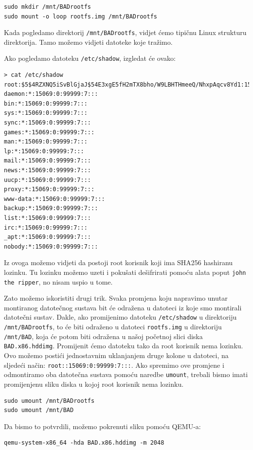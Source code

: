 \documentclass{article}
\begin{document}
\begin{verbatim}
sudo mkdir /mnt/BADrootfs
sudo mount -o loop rootfs.img /mnt/BADrootfs
\end{verbatim}

Kada pogledamo direktorij \texttt{/mnt/BADrootfs}, vidjet ćemo tipičnu Linux strukturu direktorija. Tamo možemo vidjeti datoteke koje tražimo.

Ako pogledamo datoteku \texttt{/etc/shadow}, izgledat će ovako:
\begin{verbatim}
> cat /etc/shadow
root:$5$4RZXNQ5iSvBlGjaJ$54E3xgE5fH2mTX8bho/W9LBHTHmeeQ/NhxpAqcv8Yd1:15069:0:99999:7:::
daemon:*:15069:0:99999:7:::
bin:*:15069:0:99999:7:::
sys:*:15069:0:99999:7:::
sync:*:15069:0:99999:7:::
games:*:15069:0:99999:7:::
man:*:15069:0:99999:7:::
lp:*:15069:0:99999:7:::
mail:*:15069:0:99999:7:::
news:*:15069:0:99999:7:::
uucp:*:15069:0:99999:7:::
proxy:*:15069:0:99999:7:::
www-data:*:15069:0:99999:7:::
backup:*:15069:0:99999:7:::
list:*:15069:0:99999:7:::
irc:*:15069:0:99999:7:::
_apt:*:15069:0:99999:7:::
nobody:*:15069:0:99999:7:::
\end{verbatim}

Iz ovoga možemo vidjeti da postoji root korisnik koji ima SHA256 hashiranu lozinku. Tu lozinku možemo uzeti i pokušati dešifrirati pomoću alata poput \texttt{john the ripper}, no nisam uspio u tome.

Zato možemo iskoristiti drugi trik. Svaka promjena koju napravimo unutar montiranog datotečnog sustava bit će odražena u datoteci iz koje smo montirali datotečni sustav. Dakle, ako promijenimo datoteku \texttt{/etc/shadow} u direktoriju \texttt{/mnt/BADrootfs}, to će biti odraženo u datoteci \texttt{rootfs.img} u direktoriju \texttt{/mnt/BAD}, koja će potom biti odražena u našoj početnoj slici diska \texttt{BAD.x86.hddimg}. Promijenit ćemo datoteku tako da root korisnik nema lozinku. Ovo možemo postići jednostavnim uklanjanjem druge kolone u datoteci, na sljedeći način: \texttt{root::15069:0:99999:7:::}. Ako spremimo ove promjene i odmontiramo oba datotečna sustava pomoću naredbe \texttt{umount}, trebali bismo imati promijenjenu sliku diska u kojoj root korisnik nema lozinku.

\begin{verbatim}
sudo umount /mnt/BADrootfs
sudo umount /mnt/BAD
\end{verbatim}

Da bismo to potvrdili, možemo pokrenuti sliku pomoću QEMU-a:
\begin{verbatim}
qemu-system-x86_64 -hda BAD.x86.hddimg -m 2048
\end{verbatim}
\end{document}
